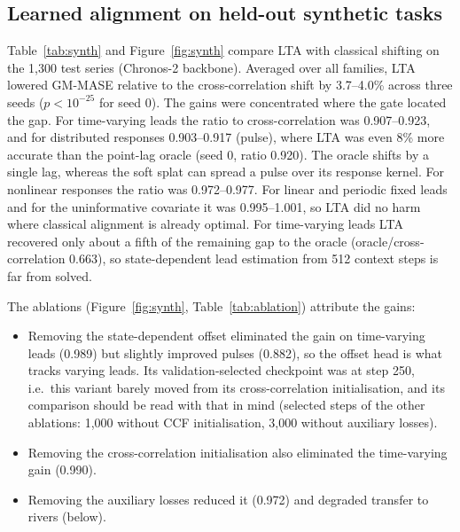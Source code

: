 \documentclass[preprint,11pt,authoryear]{elsarticle}
\newcommand{\lta}{\textsc{LTA}}
\begin{document}


\subsection{Learned alignment on held-out synthetic tasks}
\label{sec:synth}

Table~\ref{tab:synth} and Figure~\ref{fig:synth} compare \lta{} with classical shifting on the 1,300 test series (Chronos-2 backbone). Averaged over all families, \lta{} lowered GM-MASE relative to the cross-correlation shift by 3.7--4.0\% across three seeds ($p<10^{-25}$ for seed 0). The gains were concentrated where the gate located the gap. For time-varying leads the ratio to cross-correlation was 0.907--0.923, and for distributed responses 0.903--0.917 (pulse), where \lta{} was even 8\% more accurate than the point-lag oracle (seed 0, ratio 0.920). The oracle shifts by a single lag, whereas the soft splat can spread a pulse over its response kernel. For nonlinear responses the ratio was 0.972--0.977. For linear and periodic fixed leads and for the uninformative covariate it was 0.995--1.001, so \lta{} did no harm where classical alignment is already optimal. For time-varying leads \lta{} recovered only about a fifth of the remaining gap to the oracle (oracle/cross-correlation 0.663), so state-dependent lead estimation from 512 context steps is far from solved.

The ablations (Figure~\ref{fig:synth}, Table~\ref{tab:ablation}) attribute the gains:
\begin{itemize}
\item Removing the state-dependent offset eliminated the gain on time-varying leads (0.989) but slightly improved pulses (0.882), so the offset head is what tracks varying leads. Its validation-selected checkpoint was at step 250, i.e.\ this variant barely moved from its cross-correlation initialisation, and its comparison should be read with that in mind (selected steps of the other ablations: 1,000 without CCF initialisation, 3,000 without auxiliary losses).
\item Removing the cross-correlation initialisation also eliminated the time-varying gain (0.990).
\item Removing the auxiliary losses reduced it (0.972) and degraded transfer to rivers (below).
\end{itemize}
\end{document}
